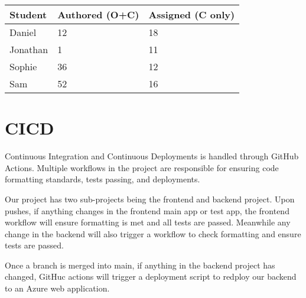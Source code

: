 \documentclass{article}
\begin{document}
\begin{table}[H]
\centering
\begin{tabular}{lll}
\toprule
\textbf{Student} & \textbf{Authored (O+C)} & \textbf{Assigned (C only)}\\
\midrule
Daniel & 12 & 18 \\
Jonathan & 1 & 11 \\
Sophie & 36 & 12 \\
Sam & 52 & 16 \\
\bottomrule
\end{tabular}
\end{table}


\section{CICD}

Continuous Integration and Continuous Deployments is handled through GitHub Actions. Multiple workflows in the project are responsible for ensuring code formatting standards, tests passing, and deployments. 

Our project has two sub-projects being the frontend and backend project. Upon pushes, if anything changes in the frontend main app or test app, the frontend workflow will ensure formatting is met and all tests are passed. Meanwhile any change in the backend will also trigger a workflow to check formatting and ensure tests are passed. 

Once a branch is merged into main, if anything in the backend project has changed, GitHuc actions will trigger a deployment script to redploy our backend to an Azure web application.
\end{document}
